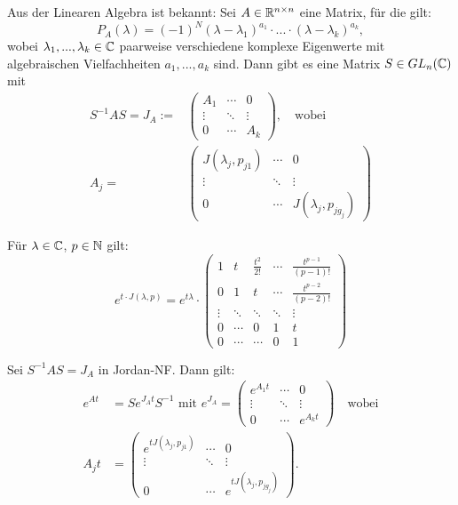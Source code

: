 \documentclass{cheat-sheet}
\begin{document}
\begin{bem}
  Aus der Linearen Algebra ist bekannt: Sei $A \in \mathbb{R}^{n \times n}$ eine Matrix, für die gilt:
  \[ P_A(\lambda) = (-1)^N (\lambda - \lambda_1)^{a_1} \cdot ... \cdot (\lambda - \lambda_k)^{a_k}, \]
  wobei $\lambda_1, ..., \lambda_k \in \mathbb{C}$ paarweise verschiedene komplexe Eigenwerte mit algebraischen Vielfachheiten $a_1, ..., a_k$ sind. Dann gibt es eine Matrix $S \in GL_n(\mathbb{C})$ mit
  \begin{align*}
    S^{-1} A S = J_A :=& \begin{pmatrix}
      A_1 & \cdots & 0\\
      \vdots & \ddots & \vdots\\
      0 & \cdots & A_k
    \end{pmatrix},
    \quad \text{wobei}\\
    A_j =& \begin{pmatrix}
      J(\lambda_j, p_{j1}) & \cdots & 0\\
      \vdots & \ddots & \vdots\\
      0 & \cdots & J(\lambda_j, p_{j g_j})
    \end{pmatrix}
  \end{align*}
\end{bem}

\begin{prop}
  Für $\lambda \in \mathbb{C}$, $p \in \mathbb{N}$ gilt:
  \[
    e^{t \cdot J(\lambda, p)} = e^{t \lambda} \cdot \begin{pmatrix}
      1 & t & \tfrac{t^2}{2!} & \cdots & \tfrac{t^{p-1}}{(p-1)!} \\
      0 & 1 & t & \cdots & \tfrac{t^{p-2}}{(p-2)!} \\
      \vdots & \ddots & \ddots & \ddots & \vdots \\
      0 & \cdots & 0 & 1 & t \\
      0 & \cdots & \cdots & 0 & 1
    \end{pmatrix}
  \]
\end{prop}

\begin{satz}
  Sei $S^{-1} A S = J_A$ in Jordan-NF. Dann gilt:
  \begin{align*}
    e^{At} &= S e^{J_A t} S^{-1} \text{ mit } e^{J_A} = \begin{pmatrix}
      e^{A_1 t} & \cdots & 0\\
      \vdots & \ddots & \vdots\\
      0 & \cdots & e^{A_k t}
    \end{pmatrix}
    \quad \text{wobei}\\
    A_j t &= \begin{pmatrix}
      e^{t J(\lambda_j, p_{j1})} & \cdots & 0\\
      \vdots & \ddots & \vdots\\
      0 & \cdots & e^{t J(\lambda_j, p_{j g_j})}
    \end{pmatrix}.
  \end{align*}
\end{satz}
\end{document}
